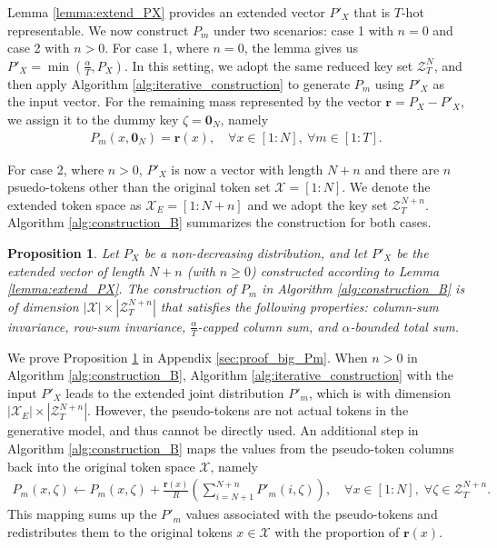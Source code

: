 \documentclass[11pt,letterpaper]{article}
\newtheorem{prop}{\textbf{Proposition}}
\newcommand{\cX}{\mathcal{X}}
\newcommand{\cZ}{\mathcal{Z}}
\begin{document}
Lemma \ref{lemma:extend_PX} provides an extended vector $P'_X$ that is $T$-hot representable. We now construct  $P_m$ under two scenarios: case 1 with $n = 0$ and case 2 with $n > 0$. For case 1, where $n = 0$, the lemma gives us $P'_X = \min(\tfrac{\alpha}{T}, P_X)$. In this setting, we adopt the same reduced key set $\cZ^N_T$, and then apply Algorithm \ref{alg:iterative_construction} to generate $P_m$ using $P'_X$ as the input vector. For the remaining mass represented by the vector $\boldsymbol{r} = P_X - P'_X$, we assign it to the dummy key $\zeta = \mathbf{0}_N$, namely
\begin{align}
    P_m(x, \mathbf{0}_N) = \boldsymbol{r}(x), \quad \forall x \in [1:N],\ \forall m \in [1:T].
\end{align} 

For case 2, where $n > 0$, $P'_X$ is now a vector with length $N+n$ and there are $n$ psuedo-tokens other than the original token set $\cX = [1:N]$. We denote the extended token space as $\cX_E = [1:N+n]$ and we adopt the key set $\cZ^{N+n}_T$. Algorithm \ref{alg:construction_B} summarizes the construction for both cases. 
\begin{prop} \label{prop:construct_big_Pm}
    Let $P_X$ be a non-decreasing distribution, and let $P'_X$ be the extended vector of length $N+n$ (with $n \geq 0$) constructed according to Lemma \ref{lemma:extend_PX}. The construction of $P_m$ in Algorithm \ref{alg:construction_B} is of dimension $|\cX|\times|\cZ^{N+n}_T|$ that satisfies the following properties: column-sum invariance, row-sum invariance, $\tfrac{\alpha}{T}$-capped column sum, and $\alpha$-bounded total sum.
\end{prop}

We prove Proposition \ref{prop:construct_big_Pm} in Appendix \ref{sec:proof_big_Pm}. When $n > 0 $ in Algorithm \ref{alg:construction_B}, Algorithm \ref{alg:iterative_construction} with the input $P'_X$ leads to the extended joint distribution $P'_m$, which is with dimension $|\cX_E| \times |\cZ^{N+n}_T|$. However, the pseudo-tokens are not actual tokens in the generative model, and thus cannot be directly used. An additional step in Algorithm \ref{alg:construction_B} maps the values from the pseudo-token columns back into the original token space $\cX$, namely
\begin{align}
    P_m(x, \zeta) \gets P_m(x, \zeta) + \frac{\boldsymbol{r}(x)}{R} \left( \sum_{i=N+1}^{N+n} P'_m (i, \zeta) \right), \quad \forall x \in [1:N], \; \forall \zeta \in \cZ^{N+n}_T.
\end{align}
This mapping sums up the $P'_m$ values associated with the pseudo-tokens and redistributes them to the original tokens $x \in \cX$ with the proportion of $\boldsymbol{r}(x)$.
\end{document}

